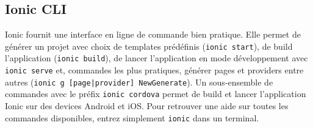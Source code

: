 \documentclass[a4paper, 12pt]{article}
\begin{document}
\subsection{Ionic CLI}
Ionic fournit une interface en ligne de commande bien pratique. Elle permet de générer un projet avec choix de templates 
prédéfinis (\texttt{ionic start}), de build l'application (\texttt{ionic build}), de lancer l'application 
en mode développement avec \texttt{ionic serve} et, commandes les plus pratiques, générer pages et providers entre 
autres (\texttt{ionic g [page|provider] NewGenerate}). Un sous-ensemble de 
commandes avec le préfix \texttt{ionic cordova} permet de build et lancer l'application Ionic sur des devices 
Android et iOS. Pour retrouver une aide sur toutes les commandes disponibles, entrez simplement \texttt{ionic} 
dans un terminal.
\end{document}
